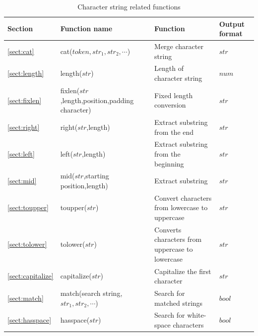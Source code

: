 \begin{table}[!hb]
\begin{center}
\caption{Character string related functions\label{tbl:mcal_char}}
{\small
  \begin{tabular}{l|l|l|l} \hline
Section&Function name&Function&Output format\\ \hline

\ref{sect:cat}& cat($token, str_1, str_2, \cdots$)&
Merge character string&
$str$\\

\ref{sect:length}& length($str$)&
Length of character string&
$num$\\


\ref{sect:fixlen}& fixlen($str$,length,position,padding character)&
Fixed length conversion&
$str$\\


\ref{sect:right}& right($str$,length)&
Extract substring from the end&
$str$\\
\ref{sect:left}& left($str$,length)&
Extract substring from the beginning&
$str$\\
\ref{sect:mid}& mid($str$,starting position,length)&
Extract substring  &
$str$\\
\ref{sect:toupper}& toupper($str$)&
Convert characters from lowercase to uppercase &
$str$\\
\ref{sect:tolower}& tolower($str$)&
Converts characters from uppercase to lowercase &
$str$\\
\ref{sect:capitalize}& capitalize($str$)&
Capitalize the first character &
$str$\\
\ref{sect:match}& match(search string,$str_1,str_2,\cdots$)&
Search for matched strings&
$bool$\\


\ref{sect:hasspace}& hasspace($str$)&
Search for white-space characters&
$bool$\\

\hline
  \end{tabular}
  }
  \end{center}
\end{table}

